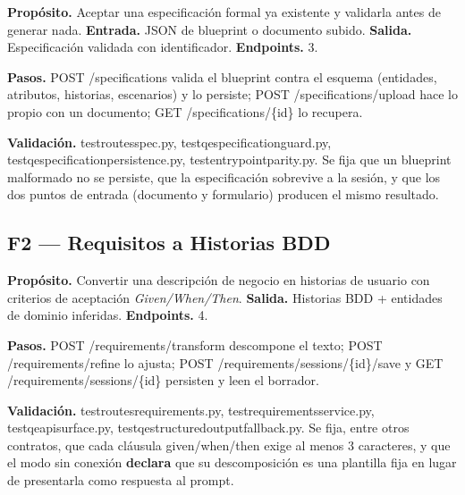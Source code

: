 \documentclass[11pt,a4paper]{article}
\newcommand{\code}[1]{{\ttfamily\small\def\_{\textunderscore\allowbreak}#1}}
\begin{document}
\begin{finding}
\textbf{Propósito.} Aceptar una especificación formal ya existente y validarla antes de generar
nada. \textbf{Entrada.} JSON de blueprint o documento subido.
\textbf{Salida.} Especificación validada con identificador. \textbf{Endpoints.} 3.
\end{finding}

\noindent\textbf{Pasos.} \code{POST /specifications} valida el blueprint contra el esquema
(entidades, atributos, historias, escenarios) y lo persiste; \code{POST /specifications/upload}
hace lo propio con un documento; \code{GET /specifications/\{id\}} lo recupera.

\noindent\textbf{Validación.} \code{test\_routes\_spec.py}, \code{test\_qe\_specification\_guard.py},
\code{test\_qe\_specification\_persistence.py}, \code{test\_entry\_point\_parity.py}. Se fija
que un blueprint malformado no se persiste, que la especificación sobrevive a la sesión, y que
los dos puntos de entrada (documento y formulario) producen el mismo resultado.

\subsection{F2 --- Requisitos a Historias BDD}

\begin{finding}
\textbf{Propósito.} Convertir una descripción de negocio en historias de usuario con criterios
de aceptación \emph{Given/When/Then}. \textbf{Salida.} Historias BDD + entidades de dominio
inferidas. \textbf{Endpoints.} 4.
\end{finding}

\noindent\textbf{Pasos.} \code{POST /requirements/transform} descompone el texto;
\code{POST /requirements/refine} lo ajusta; \code{POST /requirements/sessions/\{id\}/save} y
\code{GET /requirements/sessions/\{id\}} persisten y leen el borrador.

\noindent\textbf{Validación.} \code{test\_routes\_requirements.py},
\code{test\_requirements\_service.py}, \code{test\_qe\_api\_surface.py},
\code{test\_qe\_structured\_output\_fallback.py}. Se fija, entre otros contratos, que cada
cláusula \code{given}/\code{when}/\code{then} exige al menos 3 caracteres, y que el modo sin
conexión \textbf{declara} que su descomposición es una plantilla fija en lugar de presentarla
como respuesta al prompt.

\end{document}
